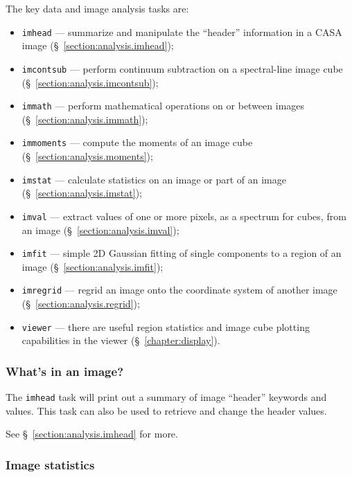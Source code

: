 The key data and image analysis tasks are:
\begin{itemize}
   \item {\tt imhead} --- summarize and manipulate the ``header'' 
         information in a CASA image 
         (\S~\ref{section:analysis.imhead});
   \item {\tt imcontsub} --- perform continuum subtraction on a
         spectral-line image cube 
         (\S~\ref{section:analysis.imcontsub});
   \item {\tt immath} --- perform mathematical operations on or
         between images
         (\S~\ref{section:analysis.immath});
   \item {\tt immoments} --- compute the moments of an image cube
         (\S~\ref{section:analysis.moments});
   \item {\tt imstat} --- calculate statistics on an image or part
         of an image
         (\S~\ref{section:analysis.imstat});
   \item {\tt imval} --- extract values of one or more pixels,
         as a spectrum for cubes, from an image
         (\S~\ref{section:analysis.imval});
   \item {\tt imfit} --- simple 2D Gaussian fitting of single
         components to a region of an image
         (\S~\ref{section:analysis.imfit});
   \item {\tt imregrid} --- regrid an image onto the coordinate
         system of another image 
         (\S~\ref{section:analysis.regrid});
   \item {\tt viewer} --- there are useful region statistics and
         image cube plotting capabilities in the viewer 
         (\S~\ref{chapter:display}).
\end{itemize}

\subsubsection{What's in an image?}
\label{section:intro.walkthru.analysis.imhead}

The {\tt imhead} task will print out a summary of image ``header'' 
keywords and values.  This task can also be
used to retrieve and change the header values.

See \S~\ref{section:analysis.imhead} for more.

\subsubsection{Image statistics}
\label{section:intro.walkthru.analysis.imstat}

